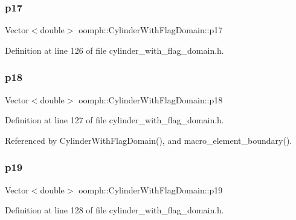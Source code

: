 \subsubsection{\texorpdfstring{p17}{p17}}
{\footnotesize\ttfamily Vector$<$double$>$ oomph\+::\+Cylinder\+With\+Flag\+Domain\+::p17\hspace{0.3cm}{\ttfamily [private]}}



Definition at line 126 of file cylinder\+\_\+with\+\_\+flag\+\_\+domain.\+h.

\mbox{\label{classoomph_1_1CylinderWithFlagDomain_a0076ec3ac4fbd0213719a2d2679ab1db}} 
\subsubsection{\texorpdfstring{p18}{p18}}
{\footnotesize\ttfamily Vector$<$double$>$ oomph\+::\+Cylinder\+With\+Flag\+Domain\+::p18\hspace{0.3cm}{\ttfamily [private]}}



Definition at line 127 of file cylinder\+\_\+with\+\_\+flag\+\_\+domain.\+h.



Referenced by Cylinder\+With\+Flag\+Domain(), and macro\+\_\+element\+\_\+boundary().

\mbox{\label{classoomph_1_1CylinderWithFlagDomain_a0a3ba355180e34fc7372fef35a6accb7}} 
\subsubsection{\texorpdfstring{p19}{p19}}
{\footnotesize\ttfamily Vector$<$double$>$ oomph\+::\+Cylinder\+With\+Flag\+Domain\+::p19\hspace{0.3cm}{\ttfamily [private]}}



Definition at line 128 of file cylinder\+\_\+with\+\_\+flag\+\_\+domain.\+h.

